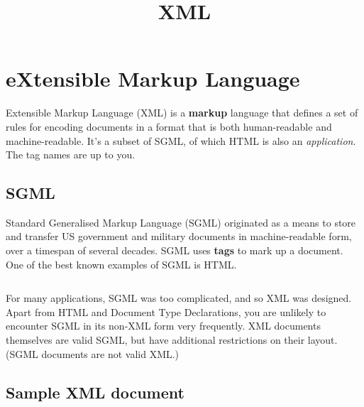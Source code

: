 \documentclass{pgnotes}
\title{XML}
\begin{document}
\maketitle




\section{eXtensible Markup Language}

Extensible Markup Language (XML) is a \textbf{markup} language that defines a set of rules for encoding documents in a format that is both human-readable and machine-readable.
It's a subset of SGML, of which HTML is also an \textit{application}. 
The tag names are up to you. 

\subsection{SGML}

Standard Generalised Markup Language (SGML) originated as a means to store and transfer US government and military documents in machine-readable form, over a timespan of several decades.
SGML uses \textbf{tags} to mark up a document.
One of the best known examples of SGML is HTML.

\inputminted{html}{htmlpage.html}

For many applications, SGML was too complicated, and so XML was designed.
Apart from HTML and Document Type Declarations, you are unlikely to encounter SGML in its non-XML form very frequently.
XML documents themselves are valid SGML, but have additional restrictions on their layout.
(SGML documents are not valid XML.)
 

\subsection{Sample XML document}
\end{document}

